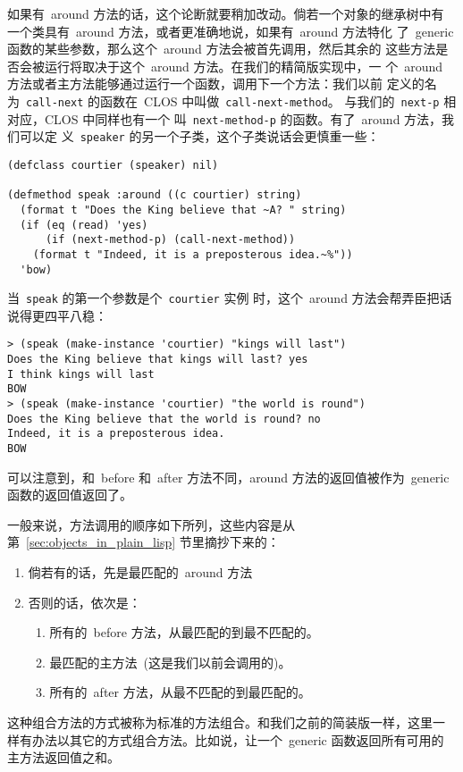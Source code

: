 如果有~around 方法的话，这个论断就要稍加改动。倘若一个对象的继承树中有
一个类具有~around 方法，或者更准确地说，如果有~around 方法特化
了~generic 函数的某些参数，那么这个~around 方法会被首先调用，然后其余的
这些方法是否会被运行将取决于这个~around 方法。在我们的精简版实现中，一
个~around 方法或者主方法能够通过运行一个函数，调用下一个方法：我们以前
定义的名为~\texttt{call-next} 的函数在~CLOS 中叫做~\verb|call-next-method|。
与我们的~\texttt{next-p} 相对应，CLOS 中同样也有一个
叫~\texttt{next-method-p} 的函数。有了~around 方法，我们可以定
义~\texttt{speaker} 的另一个子类，这个子类说话会更慎重一些：
\begin{lstlisting}
(defclass courtier (speaker) nil)

(defmethod speak :around ((c courtier) string)
  (format t "Does the King believe that ~A? " string)
  (if (eq (read) 'yes)
      (if (next-method-p) (call-next-method))
    (format t "Indeed, it is a preposterous idea.~%"))
  'bow)
\end{lstlisting}
当~\texttt{speak} 的第一个参数是个~\texttt{courtier} 实例
时，这个~around 方法会帮弄臣把话说得更四平八稳：
\begin{lstlisting}
> (speak (make-instance 'courtier) "kings will last")
Does the King believe that kings will last? yes
I think kings will last
BOW
> (speak (make-instance 'courtier) "the world is round")
Does the King believe that the world is round? no
Indeed, it is a preposterous idea.
BOW
\end{lstlisting}
可以注意到，和~before 和~after 方法不同，around 方法的返回值被作为~generic
函数的返回值返回了。

一般来说，方法调用的顺序如下所列，这些内容是从
第~\ref{sec:objects_in_plain_lisp} 节里摘抄下来的：
\begin{enumerate}
  \item 倘若有的话，先是最匹配的~around 方法
  \item 否则的话，依次是：
  \begin{enumerate}
    \item 所有的~before 方法，从最匹配的到最不匹配的。
    \item 最匹配的主方法~(这是我们以前会调用的)。
    \item 所有的~after 方法，从最不匹配的到最匹配的。
  \end{enumerate}
\end{enumerate}
这种组合方法的方式被称为标准的方法组合。和我们之前的简装版一样，这里一
样有办法以其它的方式组合方法。比如说，让一个~generic 函数返回所有可用的
主方法返回值之和。

